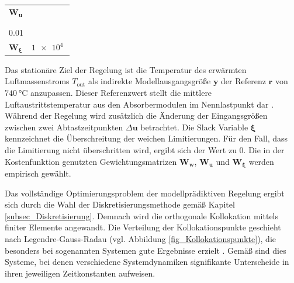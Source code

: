 \begin{table}[ht!]
\begin{tabular}{>{\centering\arraybackslash}m{}>{\centering\arraybackslash}m{}}
        $\boldsymbol{W_u}$           & \[\arraycolsep=0pt\def\arraystretch{1.2} \left(\begin{array}{c} 10 \\ 10 \\ 10 \\ \SI{0.01}{} \end{array}\right) \]                                                                 \\[-0.5cm]
        $\boldsymbol{W_{\xi}}$       & $\SI{1e4}{}$                                                                                                                                                                        \\
        \toprule
    \end{tabular}
    \label{tab_Kostenfunktion}
\end{table}
\endgroup


Das stationäre Ziel der Regelung ist die Temperatur des erwärmten Luftmassenstroms $T_{\mathrm{out}}$ als indirekte Modellausgangsgröße $\boldsymbol{y}$ der Referenz $\boldsymbol{r}$ von $\SI{740}{\celsius}$ anzupassen.
Dieser Referenzwert stellt die mittlere Luftaustrittstemperatur aus den Absorbermodulen im Nennlastpunkt dar \cite[\S.29]{HandbuchJülich}.
Während der Regelung wird zusätzlich die Änderung der Eingangsgrößen zwischen zwei Abtastzeitpunkten $\Delta \boldsymbol{u}$ betrachtet.
Die Slack Variable $\boldsymbol{\xi}$ kennzeichnet die Überschreitung der weichen Limitierungen.
Für den Fall, dass die Limitierung nicht überschritten wird, ergibt sich der Wert zu 0.
Die in der Kostenfunktion genutzten Gewichtungsmatrizen $\boldsymbol{W_w}$, $\boldsymbol{W_u}$ und $\boldsymbol{W_{\xi}}$ werden empirisch gewählt.


Das vollständige Optimierungsproblem der modellprädiktiven Regelung ergibt sich durch die Wahl der Diskretisierungsmethode gemäß Kapitel \ref{subsec_Diskretisierung}.
Demnach wird die orthogonale Kollokation mittels finiter Elemente angewandt.
Die Verteilung der Kollokationspunkte geschieht nach Legendre-Gauss-Radau (vgl. Abbildung \ref{fig_Kollokationspunkte}), die besonders bei sogenannten  Systemen gute Ergebnisse erzielt \cite[S.178]{Diehl2}.
Gemäß \cite[S.171ff]{Diehl2} sind dies Systeme, bei denen verschiedene Systemdynamiken signifikante Unterscheide in ihren jeweiligen Zeitkonstanten aufweisen.

